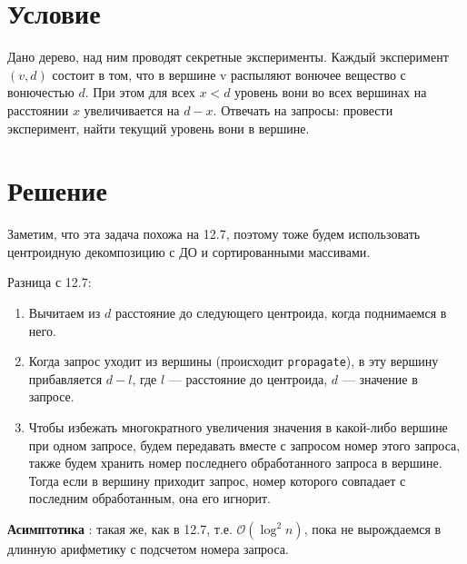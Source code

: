 \documentclass[12pt, a4paper]{article}
\begin{document}
    
\section*{Условие}

Дано дерево, над ним проводят секретные эксперименты. Каждый эксперимент $(v, d)$ состоит
в том, что в вершине v распыляют вонючее вещество с вонючестью $d$. При этом для всех $x < d$
уровень вони во всех вершинах на расстоянии $x$ увеличивается на $d - x$. Отвечать на запросы:
провести эксперимент, найти текущий уровень вони в вершине.

\section*{Решение}

Заметим, что эта задача похожа на 12.7, поэтому тоже будем использовать центроидную декомпозицию с ДО и сортированными массивами.

Разница с 12.7:
\begin{enumerate}
    \item Вычитаем из $d$ расстояние до следующего центроида, когда поднимаемся в него.
    \item Когда запрос уходит из вершины (происходит \texttt{propagate}), в эту вершину прибавляется $d-l$, где $l$ --- расстояние до центроида, $d$ --- значение в запросе.
    \item Чтобы избежать многократного увеличения значения в какой-либо вершине при одном запросе, будем передавать вместе с запросом номер этого запроса, также будем хранить номер последнего обработанного запроса в вершине. Тогда если в вершину приходит запрос, номер которого совпадает с последним обработанным, она его игнорит.
\end{enumerate}

\textbf{Асимптотика} : такая же, как в 12.7, т.е. $\mathcal O(\log^2 n)$, пока не вырождаемся в длинную арифметику с подсчетом номера запроса.
\end{document}
